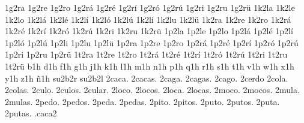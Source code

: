 {1g2ra 1g2re 1g2ro 1g2r\'a 1g2r\'e 1g2r\'i 1g2r\'o 1g2r\'u 1g2ri 1g2ru 1g2r\"u 
1k2la 1k2le 1k2lo 1k2l\'a 1k2l\'e 1k2l\'i 1k2l\'o 1k2l\'u 1k2li 1k2lu 1k2l\"u 
1k2ra 1k2re 1k2ro 1k2r\'a 1k2r\'e 1k2r\'i 1k2r\'o 1k2r\'u 1k2ri 1k2ru 1k2r\"u 
1p2la 1p2le 1p2lo 1p2l\'a 1p2l\'e 1p2l\'i 1p2l\'o 1p2l\'u 1p2li 1p2lu 1p2l\"u 
1p2ra 1p2re 1p2ro 1p2r\'a 1p2r\'e 1p2r\'i 1p2r\'o 1p2r\'u 1p2ri 1p2ru 1p2r\"u 
1t2ra 1t2re 1t2ro 1t2r\'a 1t2r\'e 1t2r\'i 1t2r\'o 1t2r\'u 1t2ri 1t2ru 1t2r\"u 
b1h d1h f1h g1h j1h k1h l1h m1h n1h p1h q1h r1h s1h t1h v1h w1h x1h y1h z1h \~n1h 
su2b2r su2b2l
2caca. 2cacas.
2caga. 2cagas.
2cago. 2cerdo
2cola. 2colas.
2culo. 2culos.
2cular.
2loco. 2locos. 2loca. 2locas.
2moco. 2mocos.
2mula. 2mulas.
2pedo. 2pedos. 2peda. 2pedas.
2pito. 2pitos.
2puto. 2putos. 2puta. 2putas.
.caca2
}
